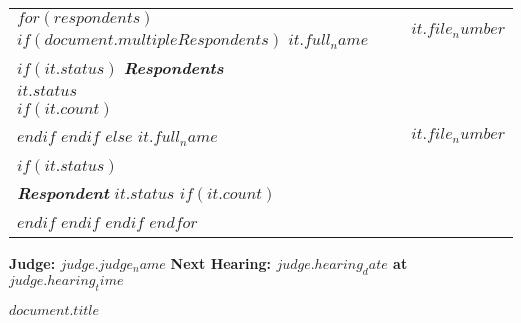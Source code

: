 \documentclass[12pt]{letter}
\begin{document}
\begin{letter}{}
\begin{flushleft}
\begin{tabular}{ p{} | p{} }
      $for(respondents)$
        $if(document.multipleRespondents)$
          \textbf{$it.full_name$} & \textbf{\hspace{1em}$it.file_number$} \\
          $if(it.status)$ 
            \textit{\textbf{Respondents}} & \\
            \textbf{$it.status$} & \\
            $if(it.count)$ 
              & \\
            $endif$
          $endif$
        $else$
          \textbf{$it.full_name$} & \textbf{\hspace{1em}$it.file_number$} \\ \\
          $if(it.status)$ 
            \vspace{.0em} & \\ 
            \textit{\textbf{Respondent}} 
            \textbf{$it.status$}
            $if(it.count)$ 
              \vspace{.25em} & \\
            $endif$
          $endif$
        $endif$    
      $endfor$

    \end{tabular}
\end{flushleft}
\makebox[0.5\textwidth]{\hrulefill}

  \vspace{2em}
  
  \begin{flushleft}
    \textbf{Judge: $judge.judge_name$} \hfill \textbf{Next Hearing: $judge.hearing_date$ at $judge.hearing_time$}
  \end{flushleft}

  \vspace{2em}
  
  \begin{center}
    \textbf{$document.title$}
  \end{center}

\end{letter}
\end{document}
